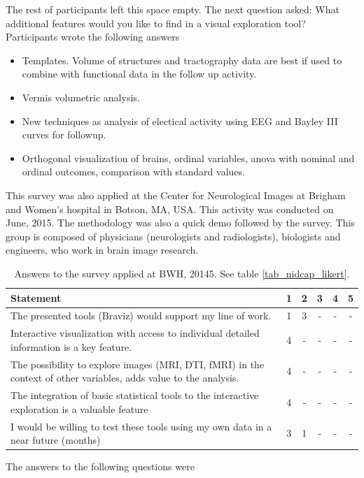 The rest of participants left this space empty. The next question asked: What additional features would you like to find in a visual exploration tool? Participants wrote the following answers
\begin{itemize}
	\item Templates. Volume of structures and tractography data are best if used to combine with functional data in the follow up activity. 
	\item Vermis volumetric analysis.
	\item New techniques as analysis of electical activity using EEG and Bayley III curves for followup. 
	\item Orthogonal visualization of brains, ordinal variables, anova with nominal and ordinal outcomes, comparison with standard values.
\end{itemize}

This survey was also applied at the Center for Neurological Images at Brigham and Women's hospital in Botson, MA, USA. This activity was conducted on June, 2015. The methodology was also a quick demo followed by the survey. This group is composed of physicians (neurologists and radiologists), biologists and engineers, who work in brain image research. 

\begin{table}
	\centering
		\begin{tabular}{p{}ccccc}
			\toprule
			Statement&1&2&3&4&5 \\
			\midrule
			The presented tools (Braviz) would support my line of work. & 1 & 3 &-& - & - \\
			Interactive visualization with access to individual detailed information is a key feature. &4&-&-&-&- \\			
			The possibility to explore images (MRI, DTI, fMRI) in the context of other variables, adds value to the analysis. &4&-&-&-&- \\
			The integration of basic statistical tools to the interactive exploration is a valuable feature &4&-&-&-&- \\
			I would be willing to test these tools using my own data in a near future (months) & 3 & 1 & - &-&- \\
			\bottomrule
		\end{tabular}
	\caption{Answers to the survey applied at BWH, 20145. See table \ref{tab_nidcap_likert}.}
	\label{tab_bwh_likert}
\end{table}

The answers to the following questions were

